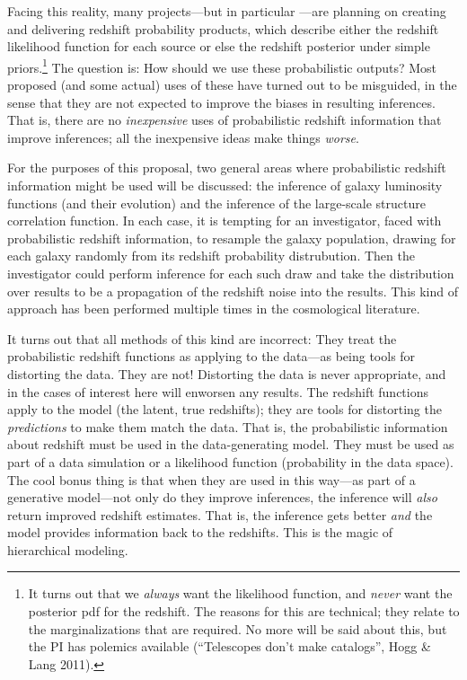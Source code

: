 \documentclass[12pt]{article}
\begin{document}
Facing this reality, many projects---but in particular \lsst---are
planning on creating and delivering redshift probability products,
which describe either the redshift likelihood function for each source
or else the redshift posterior under simple priors.\footnote{It turns
  out that we \emph{always} want the likelihood function, and
  \emph{never} want the posterior pdf for the redshift.  The reasons
  for this are technical; they relate to the marginalizations that are
  required.  No more will be said about this, but the PI has polemics
  available (``Telescopes don't make catalogs'', Hogg \& Lang 2011).}
The question is:  How should we use these probabilistic outputs?
Most proposed (and some actual) uses of these have turned out to be
misguided, in the sense that they are not expected to improve the
biases in resulting inferences.
That is, there are no \emph{inexpensive} uses of probabilistic
redshift information that improve inferences; all the inexpensive
ideas make things \emph{worse}.

For the purposes of this proposal, two general areas where
probabilistic redshift information might be used will be discussed:
the inference of galaxy luminosity functions (and their evolution) and
the inference of the large-scale structure correlation function.
In each case, it is tempting for an investigator, faced with
probabilistic redshift information, to resample the galaxy population,
drawing for each galaxy randomly from its redshift probability
distrubution.
Then the investigator could perform inference for each such draw and
take the distribution over results to be a propagation of the redshift
noise into the results.
This kind of approach has been performed multiple times in the
cosmological literature.

It turns out that all methods of this kind are incorrect:
They treat the probabilistic redshift functions as applying to the
data---as being tools for distorting the data.
They are not!
Distorting the data is never appropriate, and in the cases of interest
here will enworsen any results.
The redshift functions apply to the model (the latent, true redshifts); they are tools
for distorting the \emph{predictions} to make them match the data.
That is, the probabilistic information about redshift must be used in
the data-generating model.
They must be used as part of a data simulation or a likelihood
function (probability in the data space).
The cool bonus thing is that when they are used in this way---as part
of a generative model---not only do they improve inferences, the
inference will \emph{also} return improved redshift estimates.  That
is, the inference gets better \emph{and} the model provides
information back to the redshifts.
This is the magic of hierarchical modeling.
\end{document}
